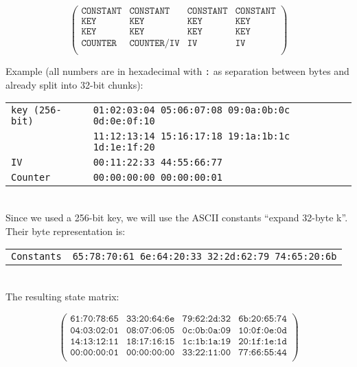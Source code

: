 \begin{equation*}
\begin{pmatrix}
\texttt{CONSTANT}& \texttt{CONSTANT} & \texttt{CONSTANT} & \texttt{CONSTANT} \\
\texttt{KEY} & \texttt{KEY} & \texttt{KEY} & \texttt{KEY} \\
\texttt{KEY} & \texttt{KEY} & \texttt{KEY} & \texttt{KEY} \\
\texttt{COUNTER} & \texttt{COUNTER/IV} & \texttt{IV} & \texttt{IV} \\
\end{pmatrix}
\end{equation*}

Example (all numbers are in hexadecimal with \texttt{:} as separation between bytes and already split into 32-bit chunks):\\

\begin{tabular}{ l l }
 \texttt{key (256-bit)} & \texttt{01:02:03:04 05:06:07:08 09:0a:0b:0c 0d:0e:0f:10} \\ 
 & \texttt{11:12:13:14 15:16:17:18 19:1a:1b:1c 1d:1e:1f:20}\\
 \texttt{IV} & \texttt{00:11:22:33 44:55:66:77} \\  
\texttt{Counter} & \texttt{00:00:00:00 00:00:00:01} \\
\end{tabular}
\\

\noindent Since we used a 256-bit key, we will use the ASCII constants ``expand 32-byte k''. Their byte representation is:\\

\begin{tabular}{ l l }
\texttt{Constants\phantom{MMMM}} & \texttt{65:78:70:61 6e:64:20:33 32:2d:62:79 74:65:20:6b} \\
\end{tabular}
\\

\noindent The resulting state matrix:

\begin{equation*}
\begin{pmatrix}
\texttt{61:70:78:65}& \texttt{33:20:64:6e} & \texttt{79:62:2d:32} & \texttt{6b:20:65:74} \\
\texttt{04:03:02:01} & \texttt{08:07:06:05} & \texttt{0c:0b:0a:09} & \texttt{10:0f:0e:0d} \\
\texttt{14:13:12:11} & \texttt{18:17:16:15} & \texttt{1c:1b:1a:19} & \texttt{20:1f:1e:1d} \\
\texttt{00:00:00:01} & \texttt{00:00:00:00} & \texttt{33:22:11:00} & \texttt{77:66:55:44} \\
\end{pmatrix}
\end{equation*}

